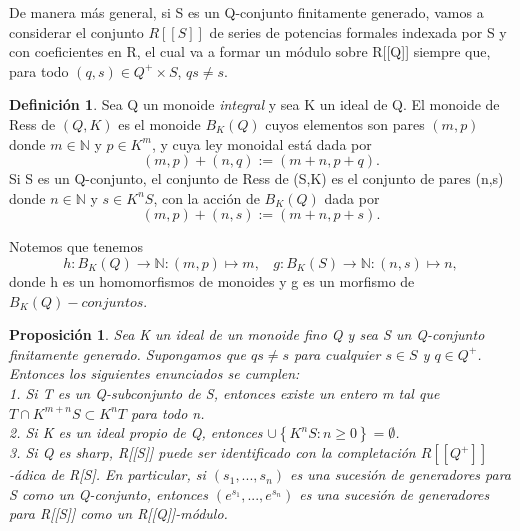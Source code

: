 \documentclass[12pt,spanish]{amsart}
\newcommand{\bb}[1]{\mathbb{#1}}
\newcommand{\set}[1]{\left\{{#1}\right\}}
\newtheorem{prop}[Theorem]{Proposición}
\theoremstyle{definition}
\newtheorem{Def}[Theorem]{Definición}
\theoremstyle{remark}
\begin{document}
De manera más general, si S es un Q-conjunto finitamente generado, vamos a considerar el conjunto $R[[S]]$ de series de potencias formales indexada por S y con coeficientes en R, el cual va a formar un módulo sobre R[[Q]] siempre que, para todo $(q,s)\in Q^{+}\times S$, $qs\neq s$. 


\begin{Def}
Sea Q un monoide \textit{integral} y sea K un ideal de Q. El monoide de Ress de $(Q,K)$ es el monoide $B_{K}(Q)$ cuyos elementos son pares $(m,p)$ donde $m\in \bb{N}$ y $p\in K^{m}$, y cuya ley monoidal está dada por $$(m,p)+(n,q):=(m+n,p+q).$$
Si S es un Q-conjunto, el conjunto de Ress de (S,K) es el conjunto de pares (n,s) donde $n\in \bb{N}$ y $s\in K^{n}S$, con la acción de $B_{K}(Q)$ dada por 
$$(m,p)+(n,s):=(m+n,p+s).$$
\end{Def}

Notemos que tenemos 
$$h:B_{K}(Q) \to \bb{N}:(m,p) \mapsto m,~~~~ g:B_{K}(S) \to \bb{N}:(n,s) \mapsto n,$$
donde h es un homomorfismos de monoides y g es un morfismo de $B_{K}(Q)-conjuntos$. 


\begin{prop}
 Sea K un ideal de un monoide fino Q y sea S un Q-conjunto finitamente generado. Supongamos que $qs\neq s$ para cualquier $s\in S$ y $q\in Q^{+}$. Entonces los siguientes enunciados se cumplen: \\
 1. Si T es un Q-subconjunto de S, entonces existe un entero m tal que $T\cap K^{m+n}S\subset K^{n}T$ para todo n. \\
 2. Si K es un ideal propio de Q, entonces $\cup \set{K^{n}S:n\geq 0}=\emptyset$. \\
 3. Si Q es \textit{sharp}, R[[S]] puede ser identificado con la completación $R[[Q^{+}]]$-ádica de R[S]. En particular, si $(s_{1},...,s_{n})$ es una sucesión de generadores para S como un Q-conjunto, entonces $(e^{s_{1}},...,e^{s_{n}})$ es una sucesión de generadores para R[[S]] como un R[[Q]]-módulo. 
\end{prop}
\end{document}
